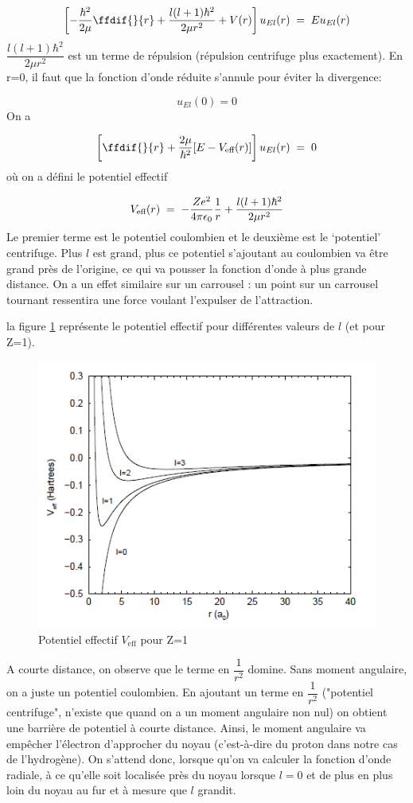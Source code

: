 \[
    \left[-\dfrac{\hbar^2}{2\mu}\ffdif{}{r}+\dfrac{l(l+1)\hbar^2}{2 \mu r^2}+V(r)\right] u_{El}(r)\eq Eu_{El}(r)
\]
$\dfrac{l(l+1)\hbar^2}{2\mu r^2}$ est un terme de répulsion (répulsion centrifuge plus exactement). En r=0, il faut que la fonction d'onde réduite s'annule pour éviter la divergence:

\[u_{El}(0)=0\]
On a

\begin{equation}
    \left[\ffdif{}{r}+\dfrac{2\mu}{\hbar^2}[E-V_\text{eff}(r)]\right]u_{El}(r)\eq 0
    \label{jsp}
\end{equation}
où on a défini le potentiel effectif

\[
    V_\text{eff}(r)\; = \; -\dfrac{Ze^2}{4\pi \epsilon_0}\dfrac{1}{r}+\dfrac{l(l+1)\hbar^2}{2\mu r^2}
\]
Le premier terme est le potentiel coulombien et le deuxième est le `potentiel' centrifuge. Plus $l$ est grand, plus ce potentiel s'ajoutant au coulombien va être grand près de l'origine, ce qui va pousser la fonction d'onde à plus grande distance. On a un effet similaire sur un carrousel : un point sur un carrousel tournant ressentira une force voulant l'expulser de l'attraction.

la figure \ref{fig:potentieleffectif} représente le potentiel effectif pour différentes valeurs de $l$ (et pour Z=1).

\begin{figure}[htp]
    \centering
    \includegraphics[scale=0.80]{Images2/rad.PNG}
    \caption{Potentiel effectif $V_\text{eff}$ pour Z=1}
    \label{fig:potentieleffectif}
\end{figure}
A courte distance, on observe que le terme en $\dfrac{1}{r^2}$ domine. Sans moment angulaire, on a juste un potentiel coulombien. En ajoutant un terme en $\dfrac{1}{r^2}$ ("potentiel centrifuge", n'existe que quand on a un moment angulaire non nul) on obtient une barrière de potentiel à courte distance. Ainsi, le moment angulaire va empêcher l'électron d'approcher du noyau (c'est-à-dire du proton dans notre cas de l'hydrogène). On s'attend donc, lorsque qu'on va calculer la fonction d'onde radiale, à ce qu'elle soit localisée près du noyau lorsque $l=0$ et de plus en plus loin du noyau au fur et à mesure que $l$ grandit.


